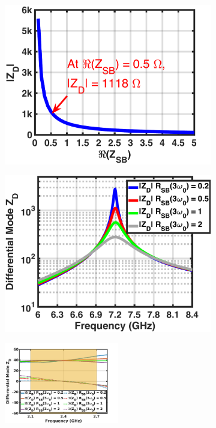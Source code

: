 \documentclass[conference]{IEEEtran}
\begin{document}
\begin{figure}[!t]
\captionsetup{font=footnotesize}
\centering
\begin{subfigure}{0.24\textwidth}
\includegraphics[width=1\textwidth]{Images/Design/Design_A_Zn_3H.pdf}
\caption{}
\label{fig:Design_A_Zn_3H}
\end{subfigure}
\begin{subfigure}{0.24\textwidth}
\includegraphics[width=1\textwidth]{Images/Design/Design_A_Rn_var_3H.pdf}
\caption{}
\label{fig:Design_A_Rn_var_3H}
\end{subfigure}
\begin{subfigure}{0.5\textwidth}
\centering
\includegraphics[width=0.55\textwidth]{Images/Design/Design_A_Rn_var_1H.jpg}

\end{subfigure}
\end{figure}
\end{document}
